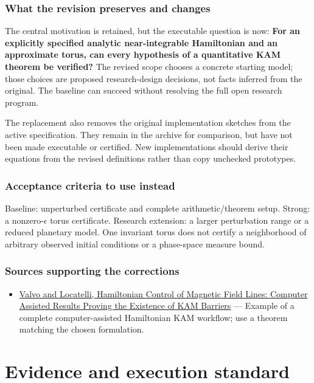 \documentclass[
  11pt,
]{article}
\providecommand{\tightlist}{%
  \setlength{\itemsep}{0pt}\setlength{\parskip}{0pt}}
\begin{document}
\subsubsection{What the revision preserves and changes}

The central motivation is retained, but the executable question is now:
\textbf{For an explicitly specified analytic near-integrable Hamiltonian
and an approximate torus, can every hypothesis of a quantitative KAM
theorem be verified?} The revised scope chooses a concrete starting
model; those choices are proposed research-design decisions, not facts
inferred from the original. The baseline can succeed without resolving
the full open research program.

The replacement also removes the original implementation sketches from
the active specification. They remain in the archive for comparison, but
have not been made executable or certified. New implementations should
derive their equations from the revised definitions rather than copy
unchecked prototypes.

\subsubsection{Acceptance criteria to use instead}

Baseline: unperturbed certificate and complete arithmetic/theorem setup.
Strong: a nonzero-\ensuremath{\epsilon} torus certificate. Research
extension: a larger perturbation range or a reduced planetary model. One
invariant torus does not certify a neighborhood of arbitrary observed
initial conditions or a phase-space measure bound.

\subsubsection{Sources supporting the corrections}

\begin{itemize}
\tightlist
\item
  \href{https://arxiv.org/abs/2101.07785}{Valvo and Locatelli,
  Hamiltonian Control of Magnetic Field Lines: Computer Assisted Results
  Proving the Existence of KAM Barriers} --- Example of a complete
  computer-assisted Hamiltonian KAM workflow; use a theorem matching the
  chosen formulation.
\end{itemize}

\section{Evidence and execution standard}
\end{document}
